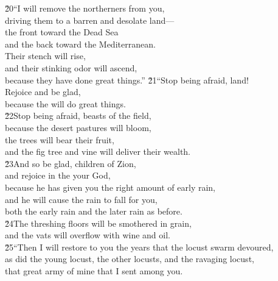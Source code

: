 \begin{poetry}
\poeml \v{20}``I will remove the northerners from you, \\
\poemll    driving them to a barren and desolate land--- \\
\poeml the front toward the Dead Sea \\
\poemll    and the back toward the Mediterranean. \\
\poeml Their stench will rise, \\
\poemll    and their stinking odor will ascend, \\
\poemlll       because they have done great things.''
\poeml \v{21}``Stop being afraid, land! \\
\poemll    Rejoice and be glad, \\
\poemlll       because the  will do great things. \\
\poeml \v{22}Stop being afraid, beasts of the field, \\
\poemll    because the desert pastures will bloom, \\
\poeml the trees will bear their fruit, \\
\poemll    and the fig tree and vine will deliver their wealth. \\
\poeml \v{23}And so be glad, children of Zion, \\
\poemll    and rejoice in the  your God, \\
\poeml because he has given you the right amount of early rain, \\
\poemll    and he will cause the rain to fall for you, \\
\poemlll       both the early rain and the later rain as before. \\
\poeml \v{24}The threshing floors will be smothered in grain, \\
\poemll    and the vats will overflow with wine and oil. \\
\poeml \v{25}``Then I will restore to you the years that the locust swarm devoured, \\
\poemll    as did the young locust, the other locusts, and the ravaging locust, \\
\poemlll       that great army of mine that I sent among you. \\

\end{poetry}

